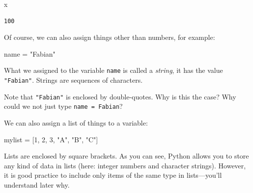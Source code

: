 \documentclass[
  a4paperpaper,
  ,captions=tableheading
]{scrbook}
\newenvironment{Shaded}{\begin{snugshade}}{\end{snugshade}}
\newcommand{\DecValTok}[1]{\textcolor[rgb]{0.68,0.00,0.00}{#1}}
\newcommand{\NormalTok}[1]{\textcolor[rgb]{0.00,0.23,0.31}{#1}}
\newcommand{\OperatorTok}[1]{\textcolor[rgb]{0.37,0.37,0.37}{#1}}
\newcommand{\StringTok}[1]{\textcolor[rgb]{0.13,0.47,0.30}{#1}}
\begin{document}
\begin{Shaded}
\begin{Highlighting}[]
\NormalTok{x}
\end{Highlighting}
\end{Shaded}

\begin{verbatim}
100
\end{verbatim}

Of course, we can also assign things other than numbers, for example:

\begin{Shaded}
\begin{Highlighting}[]
\NormalTok{name }\OperatorTok{=} \StringTok{"Fabian"}
\end{Highlighting}
\end{Shaded}

What we assigned to the variable \texttt{name} is called a
\emph{string}, it has the value \texttt{"Fabian"}. Strings are sequences
of characters.

\begin{tcolorbox}[enhanced jigsaw, arc=.35mm, colbacktitle=quarto-callout-tip-color!10!white, colback=white, breakable, toprule=.15mm, title=\textcolor{quarto-callout-tip-color}{\faLightbulb}\hspace{0.5em}{Tip}, left=2mm, bottomtitle=1mm, toptitle=1mm, leftrule=.75mm, opacitybacktitle=0.6, titlerule=0mm, opacityback=0, rightrule=.15mm, bottomrule=.15mm, coltitle=black, colframe=quarto-callout-tip-color-frame]

Note that \texttt{"Fabian"} is enclosed by double-quotes. Why is this
the case? Why could we not just type \texttt{name\ =\ Fabian}?

\end{tcolorbox}

We can also assign a list of things to a variable:

\begin{Shaded}
\begin{Highlighting}[]
\NormalTok{mylist }\OperatorTok{=}\NormalTok{ [}\DecValTok{1}\NormalTok{, }\DecValTok{2}\NormalTok{, }\DecValTok{3}\NormalTok{, }\StringTok{"A"}\NormalTok{, }\StringTok{"B"}\NormalTok{, }\StringTok{"C"}\NormalTok{]}
\end{Highlighting}
\end{Shaded}

Lists are enclosed by square brackets. As you can see, Python allows you
to store any kind of data in lists (here: integer numbers and character
strings). However, it is good practice to include only items of the same
type in lists---you'll understand later why.
\end{document}
